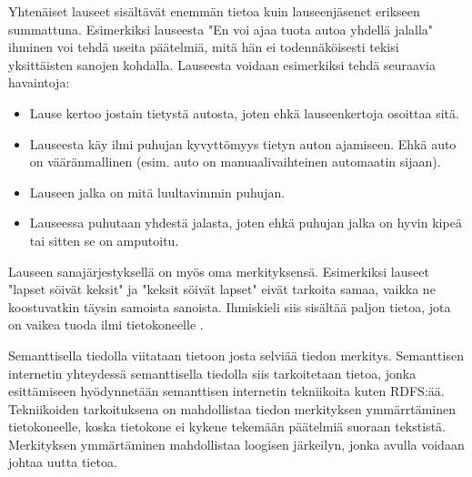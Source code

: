 \documentclass[finnish, 12pt, a4paper, elec, utf8, pdfa, online]{aaltothesis}
\begin{document}
Yhtenäiset lauseet sisältävät enemmän tietoa kuin lauseenjäsenet erikseen summattuna. Esimerkiksi lauseesta "En voi ajaa tuota autoa yhdellä jalalla" ihminen voi tehdä useita päätelmiä, mitä hän ei todennäköisesti tekisi yksittäisten sanojen kohdalla. Lauseesta voidaan esimerkiksi tehdä seuraavia havaintoja:
\begin{itemize}
  \item  Lause kertoo jostain tietystä autosta, joten ehkä lauseenkertoja osoittaa sitä.
  \item  Lauseesta käy ilmi puhujan kyvyttömyys tietyn auton ajamiseen. Ehkä auto on vääränmallinen (esim. auto on manuaalivaihteinen automaatin sijaan).
  \item  Lauseen jalka on mitä luultavimmin puhujan.
  \item  Lauseessa puhutaan yhdestä jalasta, joten ehkä puhujan jalka on hyvin kipeä tai sitten se on amputoitu.
\end{itemize}
Lauseen sanajärjestyksellä on myös oma merkityksensä. Esimerkiksi lauseet "lapset söivät keksit" ja "keksit söivät lapset" eivät tarkoita samaa, vaikka ne koostuvatkin täysin samoista sanoista. Ihmiskieli siis sisältää paljon tietoa, jota on vaikea tuoda ilmi tietokoneelle \cite{semantics}.

Semanttisella tiedolla viitataan tietoon josta selviää tiedon merkitys. Semanttisen internetin yhteydessä semanttisella tiedolla siis tarkoitetaan tietoa, jonka esittämiseen hyödynnetään semanttisen internetin tekniikoita kuten RDFS:ää. Tekniikoiden tarkoituksena on mahdollistaa tiedon merkityksen ymmärrtäminen tietokoneelle, koska tietokone ei kykene tekemään päätelmiä suoraan tekstistä. Merkityksen ymmärtäminen mahdollistaa loogisen järkeilyn, jonka avulla voidaan johtaa uutta tietoa.
\end{document}
